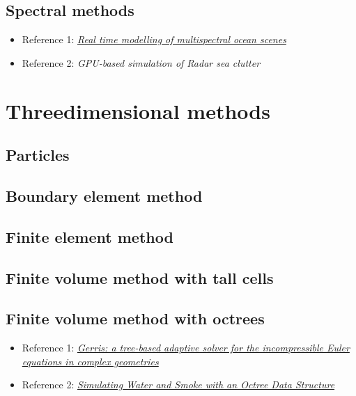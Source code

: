 \documentclass[]{report}
\begin{document}
\subsection{Spectral methods}

\begin{itemize}
    \item Reference 1: \textit{\href{http://web1.see.asso.fr/ocoss2010/Session_4/20100531111216_Monnier_OCOSS2010-Paper_MERCUDA_item_2.pdf}{Real time modelling of multispectral ocean scenes}}
    \item Reference 2: \textit{GPU-based simulation of Radar sea clutter}
\end{itemize}

\section{Threedimensional methods}

\subsection{Particles}

\subsection{Boundary element method}

\subsection{Finite element method}

\subsection{Finite volume method with tall cells}

\subsection{Finite volume method with octrees}

\begin{itemize}
    \item Reference 1: \textit{\href{http://gfs.sourceforge.net/gerris.pdf}{Gerris: a tree-based adaptive solver for the incompressible Euler equations in complex geometries}}
    \item Reference 2: \textit{\href{http://physbam.stanford.edu/~fedkiw/papers/stanford2004-02.pdf}{Simulating Water and Smoke with an Octree Data Structure}}
\end{itemize}
\end{document}
